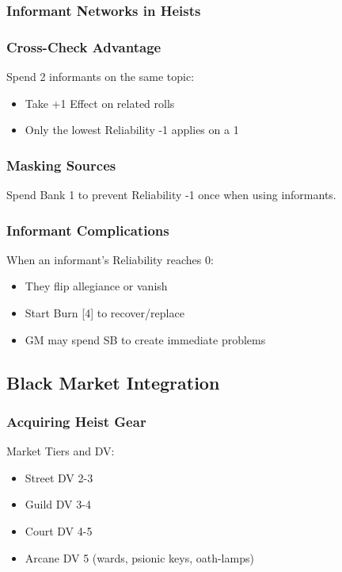 \documentclass[11pt]{article}
\begin{document}
\subsubsection{Informant Networks in Heists}

\subsubsection{Cross-Check Advantage}

Spend 2 informants on the same topic:
\begin{itemize}
    \item Take +1 Effect on related rolls
    \item Only the lowest Reliability -1 applies on a 1
\end{itemize}

\subsubsection{Masking Sources}

Spend Bank 1 to prevent Reliability -1 once when using informants.

\subsubsection{Informant Complications}

When an informant's Reliability reaches 0:
\begin{itemize}
    \item They flip allegiance or vanish
    \item Start Burn [4] to recover/replace
    \item GM may spend SB to create immediate problems
\end{itemize}

\subsection{Black Market Integration}

\subsubsection{Acquiring Heist Gear}

Market Tiers and DV:
\begin{itemize}
    \item Street DV 2-3
    \item Guild DV 3-4  
    \item Court DV 4-5
    \item Arcane DV 5 (wards, psionic keys, oath-lamps)
\end{itemize}
\end{document}
